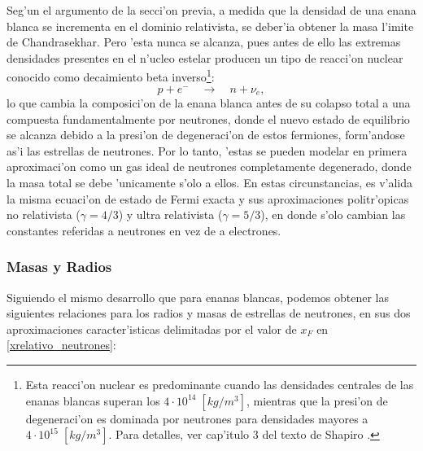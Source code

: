 Seg'un el argumento de la secci'on previa, a medida que la densidad de una enana blanca se incrementa en el dominio relativista, se deber'ia obtener la masa l'imite de Chandrasekhar. Pero 'esta nunca se alcanza, pues antes de ello las extremas densidades presentes en el n'ucleo estelar producen un tipo de reacci'on nuclear conocido como decaimiento beta inverso\footnote{Esta reacci'on nuclear es predominante cuando las densidades centrales de las enanas blancas superan los $4\cdot10^{14}\;[kg/m^3]$, mientras que la presi'on de degeneraci'on es dominada por neutrones para densidades mayores a $4\cdot10^{15}\;[kg/m^3]$. Para detalles, ver cap'itulo 3 del texto de Shapiro \cite{Shapiro83}. }:
\begin{equation}
 p+e^{-}\quad\longrightarrow\quad n+\nu_{e},
\end{equation}
lo que cambia la composici'on de la enana blanca antes de su colapso total a una compuesta fundamentalmente por neutrones, donde el nuevo estado de equilibrio se alcanza debido a la presi'on de degeneraci'on de estos fermiones, form'andose as'i las estrellas de neutrones. Por lo tanto, 'estas se pueden modelar en primera aproximaci'on como un gas ideal de neutrones completamente degenerado, donde la masa total se debe 'unicamente s'olo a ellos. En estas circunstancias, es v'alida la misma ecuaci'on de estado de Fermi exacta y sus aproximaciones politr'opicas no relativista ($\gamma=4/3$) y ultra relativista ($\gamma=5/3$), en donde s'olo cambian las constantes referidas a neutrones en vez de a electrones.

\subsubsection{Masas y Radios}
Siguiendo el mismo desarrollo que para enanas blancas, podemos obtener las siguientes relaciones para los radios y masas de estrellas de neutrones, en sus dos aproximaciones caracter'isticas delimitadas por el valor de $x_F$ en \eqref{xrelativo_neutrones}:

